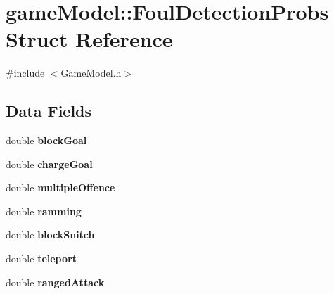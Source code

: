 \hypertarget{structgame_model_1_1_foul_detection_probs}{\section{game\-Model\-:\-:Foul\-Detection\-Probs Struct Reference}
\label{structgame_model_1_1_foul_detection_probs}
}


{\ttfamily \#include $<$Game\-Model.\-h$>$}

\subsection*{Data Fields}
\begin{DoxyCompactItemize}
\item 
\hypertarget{structgame_model_1_1_foul_detection_probs_a4c83c08fe1e8b4f968aa6a7f7bd543bf}{double {\bfseries block\-Goal}}\label{structgame_model_1_1_foul_detection_probs_a4c83c08fe1e8b4f968aa6a7f7bd543bf}

\item 
\hypertarget{structgame_model_1_1_foul_detection_probs_add465246ba17e671a07231900449327f}{double {\bfseries charge\-Goal}}\label{structgame_model_1_1_foul_detection_probs_add465246ba17e671a07231900449327f}

\item 
\hypertarget{structgame_model_1_1_foul_detection_probs_ac9ca7891ddf324a2cd13d95f4402eabd}{double {\bfseries multiple\-Offence}}\label{structgame_model_1_1_foul_detection_probs_ac9ca7891ddf324a2cd13d95f4402eabd}

\item 
\hypertarget{structgame_model_1_1_foul_detection_probs_a7b9d645c139c65a0dd1f8241650a33b9}{double {\bfseries ramming}}\label{structgame_model_1_1_foul_detection_probs_a7b9d645c139c65a0dd1f8241650a33b9}

\item 
\hypertarget{structgame_model_1_1_foul_detection_probs_a3d2cf05df68174cc892fa14a62d2409c}{double {\bfseries block\-Snitch}}\label{structgame_model_1_1_foul_detection_probs_a3d2cf05df68174cc892fa14a62d2409c}

\item 
\hypertarget{structgame_model_1_1_foul_detection_probs_a357e0818580014857d179c4b4fd6868c}{double {\bfseries teleport}}\label{structgame_model_1_1_foul_detection_probs_a357e0818580014857d179c4b4fd6868c}

\item 
\hypertarget{structgame_model_1_1_foul_detection_probs_aa885ca6840d0692043d391b175c361a8}{double {\bfseries ranged\-Attack}}\label{structgame_model_1_1_foul_detection_probs_aa885ca6840d0692043d391b175c361a8}


\end{DoxyCompactItemize}
